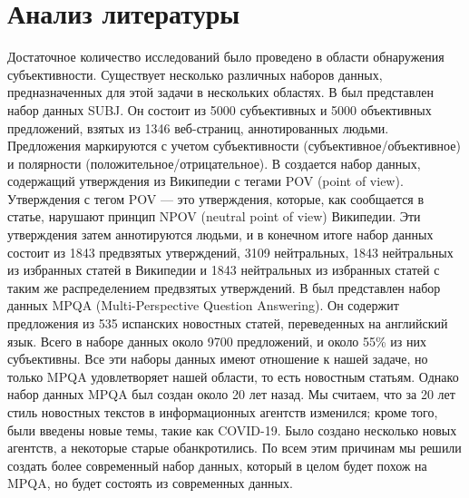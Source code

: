 \documentclass[conference]{IEEEtran}
\begin{document}
\section{Анализ литературы}
Достаточное количество исследований было проведено в области обнаружения субъективности. Существует несколько различных наборов данных, предназначенных для этой задачи в нескольких областях. В \cite{subj} был представлен набор данных SUBJ. Он состоит из 5000 субъективных и 5000 объективных предложений, взятых из 1346 веб-страниц, аннотированных людьми. Предложения маркируются с учетом субъективности (субъективное/объективное) и полярности (положительное/отрицательное). В \cite{wikipedia-biased-statements} создается набор данных, содержащий утверждения из Википедии с тегами POV (point of view). Утверждения с тегом POV — это утверждения, которые, как сообщается в статье, нарушают принцип NPOV (neutral point of view) Википедии. Эти утверждения затем аннотируются людьми, и в конечном итоге набор данных состоит из 1843 предвзятых утверждений, 3109 нейтральных, 1843 нейтральных из избранных статей в Википедии и 1843 нейтральных из избранных статей с таким же распределением предвзятых утверждений. В \cite{mpqa} был представлен набор данных MPQA (Multi-Perspective Question Answering). Он содержит предложения из 535 испанских новостных статей, переведенных на английский язык. Всего в наборе данных около 9700 предложений, и около 55\% из них субъективны. Все эти наборы данных имеют отношение к нашей задаче, но только MPQA удовлетворяет нашей области, то есть новостным статьям. Однако набор данных MPQA был создан около 20 лет назад. Мы считаем, что за 20 лет стиль новостных текстов в информационных агентств изменился; кроме того, были введены новые темы, такие как COVID-19. Было создано несколько новых агентств, а некоторые старые обанкротились. По всем этим причинам мы решили создать более современный набор данных, который в целом будет похож на MPQA, но будет состоять из современных данных.
\end{document}
